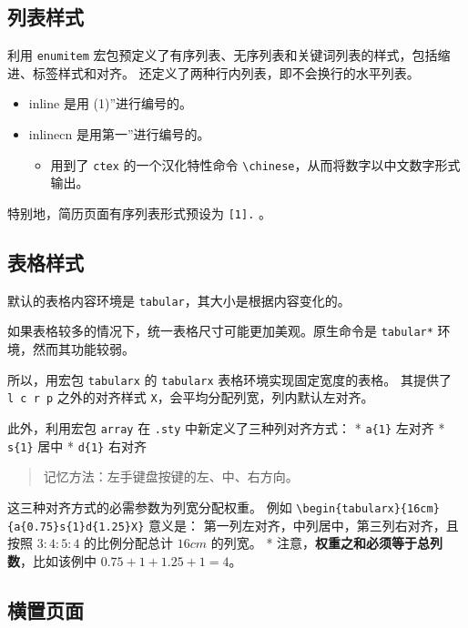 \documentclass[../Main/thesis.tex]{subfiles}
\begin{document}
\subsection{列表样式}

利用 \texttt{enumitem}
宏包预定义了有序列表、无序列表和关键词列表的样式，包括缩进、标签样式和对齐。
还定义了两种行内列表，即不会换行的水平列表。

\begin{itemize}
\item
  inline 是用 (1)''进行编号的。
\item
  inlinecn 是用第一''进行编号的。

  \begin{itemize}
  \item
    用到了 \texttt{ctex} 的一个汉化特性命令
    \texttt{\textbackslash{}chinese}，从而将数字以中文数字形式输出。
  \end{itemize}
\end{itemize}

特别地，简历页面有序列表形式预设为 \texttt{[1].} 。

\subsection{表格样式}

默认的表格内容环境是 \texttt{tabular}，其大小是根据内容变化的。

如果表格较多的情况下，统一表格尺寸可能更加美观。原生命令是
\texttt{tabular*} 环境，然而其功能较弱。

所以，用宏包 \texttt{tabularx} 的 \texttt{tabularx}
表格环境实现固定宽度的表格。 其提供了 \texttt{l\ c\ r\ p} 之外的对齐样式
\texttt{X}，会平均分配列宽，列内默认左对齐。

此外，利用宏包 \texttt{array} 在 \texttt{.sty}
中新定义了三种列对齐方式： * \texttt{a\{1\}} 左对齐 * \texttt{s\{1\}}
居中 * \texttt{d\{1\}} 右对齐

\begin{quote}
记忆方法：左手键盘按键的左、中、右方向。
\end{quote}

这三种对齐方式的必需参数为列宽分配权重。 例如
\texttt{\textbackslash{}begin\{tabularx\}\{16cm\}\{a\{0.75\}s\{1\}d\{1.25\}X\}}
意义是： 第一列左对齐，中列居中，第三列右对齐，且按照 \(3:4:5:4\)
的比例分配总计 \(16cm\) 的列宽。 *
注意，\textbf{权重之和必须等于总列数}，比如该例中 \(0.75+1+1.25+1=4\)。

\subsection{横置页面}
\end{document}

